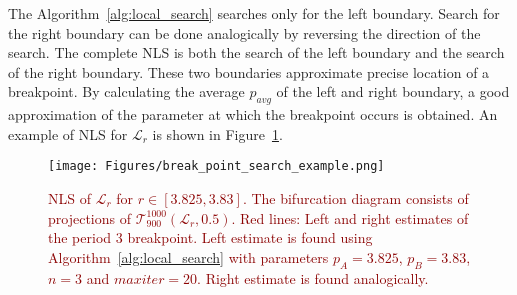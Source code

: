 \par
The Algorithm~\ref{alg:local_search} searches only for the left boundary. Search for the right boundary can be done analogically by reversing the direction of the search.
The complete NLS is both the search of the left boundary and the search of the right boundary.
These two boundaries approximate precise location of a breakpoint.
By calculating the average $p_{avg}$ of the left and right boundary, a good approximation of the parameter at which the breakpoint occurs is obtained.
An example of NLS for $\mathcal{L}_{r}$ is shown in Figure~\ref{fig:break_point_search_example}.

\begin{figure}[!h]
    \centering
    \texttt{[image: Figures/break\_point\_search\_example.png]}
    \caption{
        \textcolor{darkred}{
        NLS of $\mathcal{L}_{r}$ for $r \in [ 3.825, 3.83 ]$.
        The bifurcation diagram consists of projections of $\mathcal{T}_{900}^{1000}(\mathcal{L}_{r}, 0.5)$.
        Red lines: Left and right estimates of the period $3$ breakpoint.
        Left estimate is found using Algorithm~\ref{alg:local_search} with parameters $p_A = 3.825$, $p_B = 3.83$, $n = 3$ and $maxiter = 20$.
        Right estimate is found analogically.
        }
    }
    \label{fig:break_point_search_example}
\end{figure}



